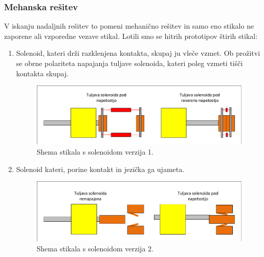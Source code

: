\documentclass[a4paper,twoside,openright,12pt,slovene]{book}
\begin{document}
	\subsubsection{Mehanska rešitev} \label{Mehanska rešitev}    
    
    
    V iskanju nadaljnih rešitev to pomeni mehanično rešitev in samo eno stikalo ne zaporene ali vzporedne vezave stikal. Lotili smo se hitrih prototipov štirih stikal:
    \begin{enumerate}
   
        \item  Solenoid, kateri drži razklenjena kontakta, skupaj ju vleče vzmet. Ob prožitvi se obrne polariteta napajanja tuljave solenoida, kateri poleg vzmeti tišči kontakta skupaj.
    \begin{figure}[H]
        \centering
        \includegraphics[width=1\columnwidth]{Sheme/StikaloSolenoidVerzija1.pdf}
        \caption{\label{/StikaloSolenoidVerzija1} Shema stikala s solenoidom verzija 1.}
    \end{figure}
    
    \item  Solenoid kateri, porine kontakt in jezička ga ujameta.
    \begin{figure}[H]
        \centering
        \includegraphics[width=1\columnwidth]{Sheme/StikaloSolenoidVerzija2.pdf}
        \caption{\label{/StikaloSolenoidVerzija2} Shema stikala s solenoidom verzija 2.}
    \end{figure}
    

\end{enumerate}
\end{document}
